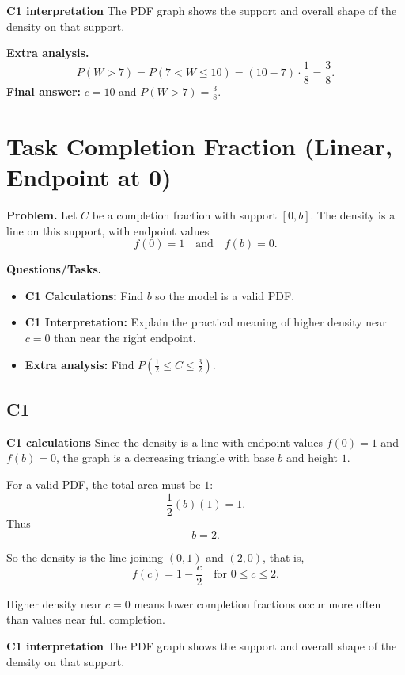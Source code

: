 	\textbf{C1 interpretation}
	The PDF graph shows the support and overall shape of the density on that support.
	
	\textbf{Extra analysis.}
	\[
	P(W>7)=P(7<W\le10)=(10-7)\cdot\frac18=\frac38.
	\]
	\textbf{Final answer:} $c=10$ and $P(W>7)=\frac38$.
	
	\section{Task Completion Fraction (Linear, Endpoint at 0)}
	
	\textbf{Problem.}
	Let $C$ be a completion fraction with support $[0,b]$. The density is a line on this support, with endpoint values
	\[
	f(0)=1
	\quad\text{and}\quad
	f(b)=0.
	\]
	
	\textbf{Questions/Tasks.}
	\begin{itemize}
		\item \textbf{C1 Calculations:} Find $b$ so the model is a valid PDF.
		\item \textbf{C1 Interpretation:} Explain the practical meaning of higher density near $c=0$ than near the right endpoint.
		\item \textbf{Extra analysis:} Find $P\!\left(\frac{1}{2}\le C\le \frac{3}{2}\right)$.
	\end{itemize}
	
	\subsection*{C1}
	
	\textbf{C1 calculations}
	Since the density is a line with endpoint values $f(0)=1$ and $f(b)=0$, the graph is a decreasing triangle with base $b$ and height $1$.
	
	For a valid PDF, the total area must be $1$:
	\[
	\frac12(b)(1)=1.
	\]
	Thus
	\[
	b=2.
	\]
	
	So the density is the line joining $(0,1)$ and $(2,0)$, that is,
	\[
	f(c)=1-\frac{c}{2}\quad\text{for }0\le c\le 2.
	\]
	
	Higher density near $c=0$ means lower completion fractions occur more often than values near full completion.
	
	\textbf{C1 interpretation}
	The PDF graph shows the support and overall shape of the density on that support.
	
